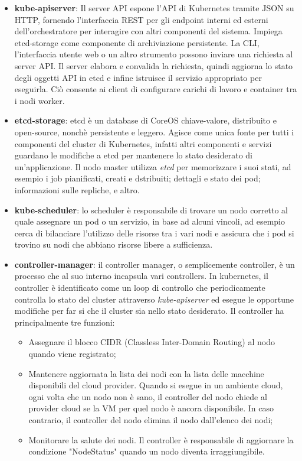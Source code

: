 \documentclass[12pt, a4paper]{report}
\begin{document}
\begin{itemize}
  \item \textbf{kube-apiserver}: Il server API espone l'API di Kubernetes tramite JSON su HTTP, fornendo l'interfaccia REST per gli endpoint interni ed esterni dell'orchestratore per interagire con altri componenti del sistema. Impiega etcd-storage come componente di archiviazione persistente. La CLI, l'interfaccia utente web o un altro strumento possono inviare una richiesta al server API. Il server elabora e convalida la richiesta, quindi aggiorna lo stato degli oggetti API in etcd e infine istruisce il servizio appropriato per eseguirla. Ciò consente ai client di configurare carichi di lavoro e container tra i nodi worker.
  \item \textbf{etcd-storage}: etcd è un database di CoreOS chiave-valore, distribuito e open-source, nonchè persistente e leggero. Agisce come unica fonte per tutti i componenti del cluster di Kubernetes, infatti altri componenti e servizi guardano le modifiche a etcd per mantenere lo stato desiderato di un'applicazione. Il nodo master utilizza \textit{etcd} per memorizzare i suoi stati, ad esempio i job pianificati, creati e dstribuiti; dettagli e stato dei pod; informazioni sulle repliche, e altro.
  \item \textbf{kube-scheduler}: lo scheduler è responsabile di trovare un nodo corretto al quale assegnare un pod o un servizio, in base ad alcuni vincoli, ad esempio cerca di bilanciare l'utilizzo delle risorse tra i vari nodi e assicura che i pod si trovino su nodi che abbiano risorse libere a sufficienza.
  \item \textbf{controller-manager}: il controller manager, o semplicemente controller, è un processo che al suo interno incapsula vari controllers. In kubernetes, il controller è identificato come un loop di controllo che periodicamente controlla lo stato del cluster attraverso \textit{kube-apiserver} ed esegue le opportune modifiche per far si che il cluster sia nello stato desiderato. Il controller ha principalmente tre funzioni:
  \begin{itemize}
    \item Assegnare il blocco CIDR (Classless Inter-Domain Routing) al nodo quando viene registrato;
    \item Mantenere aggiornata la lista dei nodi con la lista delle macchine disponibili del cloud provider. Quando si esegue in un ambiente cloud, ogni volta che un nodo non è sano, il controller del nodo chiede al provider cloud se la VM per quel nodo è ancora disponibile. In caso contrario, il controller del nodo elimina il nodo dall'elenco dei nodi;
    \item Monitorare la salute dei nodi. Il controller è responsabile di aggiornare la condizione "NodeStatus" quando un nodo diventa irraggiungibile.
  \end{itemize}
\end{itemize}
\end{document}
